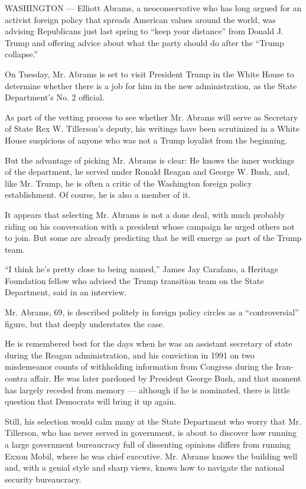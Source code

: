 WASHINGTON --- Elliott Abrams, a neoconservative who has long argued for
an activist foreign policy that spreads American values around the
world, was advising Republicans just last spring to ``keep your
distance'' from Donald J. Trump and offering advice about what the party
should do after the ``Trump collapse.''

On Tuesday, Mr. Abrams is set to visit President Trump in the White
House to determine whether there is a job for him in the new
administration, as the State Department's No. 2 official.

As part of the vetting process to see whether Mr. Abrams will serve as
Secretary of State Rex W. Tillerson's deputy, his writings have been
scrutinized in a White House suspicious of anyone who was not a Trump
loyalist from the beginning.

But the advantage of picking Mr. Abrams is clear: He knows the inner
workings of the department, he served under Ronald Reagan and George W.
Bush, and, like Mr. Trump, he is often a critic of the Washington
foreign policy establishment. Of course, he is also a member of it.

It appears that selecting Mr. Abrams is not a done deal, with much
probably riding on his conversation with a president whose campaign he
urged others not to join. But some are already predicting that he will
emerge as part of the Trump team.

``I think he's pretty close to being named,'' James Jay Carafano, a
Heritage Foundation fellow who advised the Trump transition team on the
State Department, said in an interview.

Mr. Abrams, 69, is described politely in foreign policy circles as a
``controversial'' figure, but that deeply understates the case.

He is remembered best for the days when he was an assistant secretary of
state during the Reagan administration, and his conviction in 1991 on
two misdemeanor counts of withholding information from Congress during
the Iran-contra affair. He was later pardoned by President George Bush,
and that moment has largely receded from memory --- although if he is
nominated, there is little question that Democrats will bring it up
again.

Still, his selection would calm many at the State Department who worry
that Mr. Tillerson, who has never served in government, is about to
discover how running a large government bureaucracy full of dissenting
opinions differs from running Exxon Mobil, where he was chief executive.
Mr. Abrams knows the building well and, with a genial style and sharp
views, knows how to navigate the national security bureaucracy.

